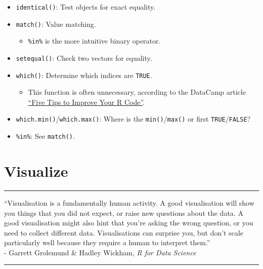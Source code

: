 \documentclass[]{book}
\providecommand{\tightlist}{%
  \setlength{\itemsep}{0pt}\setlength{\parskip}{0pt}}
\begin{document}
\begin{itemize}
\tightlist
\item
  \texttt{identical()}: Test objects for exact equality.
\item
  \texttt{match()}: Value matching.

  \begin{itemize}
  \tightlist
  \item
    \texttt{\%in\%} is the more intuitive binary operator.
  \end{itemize}
\item
  \texttt{setequal()}: Check two vectors for equality.
\item
  \texttt{which()}: Determine which indices are \texttt{TRUE}.

  \begin{itemize}
  \tightlist
  \item
    This function is often unnecessary, according to the DataCamp article \href{https://www.datacamp.com/community/tutorials/five-tips-r-code-improve}{``Five Tips to Improve Your R Code''}.
  \end{itemize}
\item
  \texttt{which.min()}/\texttt{which.max()}: Where is the \texttt{min()}/\texttt{max()} or first \texttt{TRUE}/\texttt{FALSE}?
\item
  \texttt{\%in\%}: See \texttt{match()}.
\end{itemize}

\hypertarget{visualize}{%
\chapter{Visualize}\label{visualize}}

\begin{center}\rule{0.5\linewidth}{\linethickness}\end{center}

``Visualisation is a fundamentally human activity. A good visualisation will show you things that you did not expect, or raise new questions about the data. A good visualisation might also hint that you're asking the wrong question, or you need to collect different data. Visualisations can surprise you, but don't scale particularly well because they require a human to interpret them.''\\
- Garrett Grolemund \& Hadley Wickham, \emph{R for Data Science}

\begin{center}\rule{0.5\linewidth}{\linethickness}\end{center}
\end{document}
